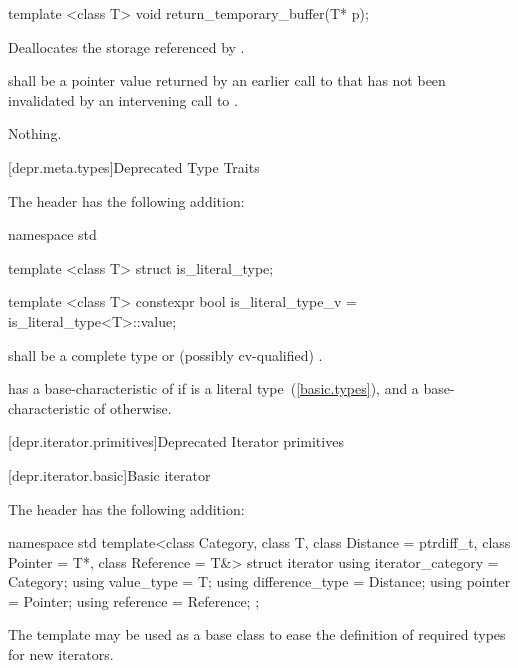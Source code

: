 %
\begin{itemdecl}
template <class T> void return_temporary_buffer(T* p);
\end{itemdecl}

\begin{itemdescr}
\pnum
\effects
Deallocates the storage referenced by .

\pnum
\requires
{} shall be a pointer value returned by an earlier call to
 that has not been invalidated by
an intervening call to .

\pnum
\throws
Nothing.
\end{itemdescr}

[depr.meta.types]{Deprecated Type Traits}

\pnum
The header  has the following addition:

%
\begin{codeblock}
namespace std {
  template <class T> struct is_literal_type;

  template <class T> constexpr bool is_literal_type_v = is_literal_type<T>::value;
}
\end{codeblock}

\pnum
\requires
{} shall be a complete type or (possibly
cv-qualified) .

\pnum
\effects
{} has a base-characteristic of  if
 is a literal type~(\ref{basic.types}), and a base-characteristic of
 otherwise.

[depr.iterator.primitives]{Deprecated Iterator primitives}

[depr.iterator.basic]{Basic iterator}

\pnum
The header  has the following addition:

%
\begin{codeblock}
namespace std {
  template<class Category, class T, class Distance = ptrdiff_t,
    class Pointer = T*, class Reference = T&>
  struct iterator {
    using iterator_category = Category;
    using value_type        = T;
    using difference_type   = Distance;
    using pointer           = Pointer;
    using reference         = Reference;
  };
}
\end{codeblock}

\pnum
The
template may be used as a base class to ease the definition of required types
for new iterators.

